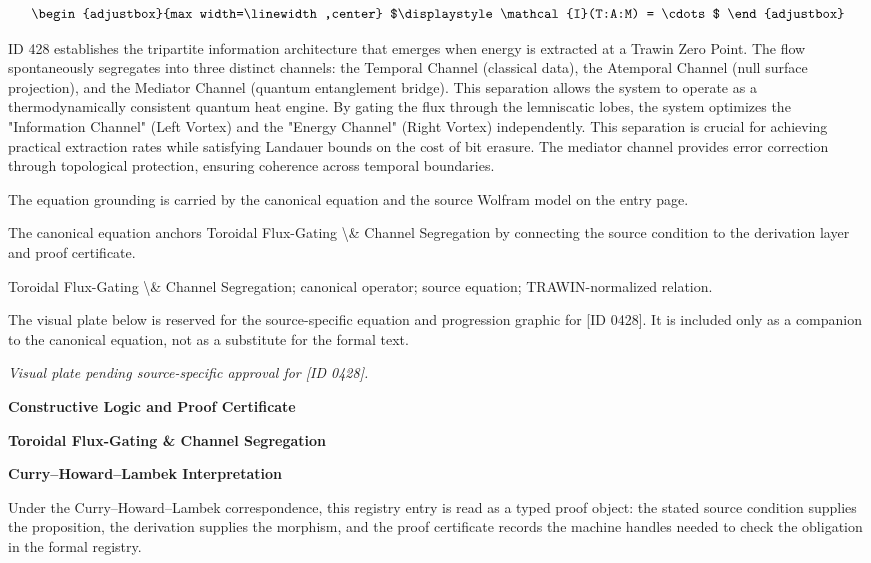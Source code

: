 \[
\begin{adjustbox}{max width=\linewidth,center}
$\displaystyle
\mathcal{I}(T:A:M) = \cdots
$
\end{adjustbox}
\]

ID 428 establishes the tripartite information architecture that emerges when energy is extracted at a Trawin Zero Point. The flow spontaneously segregates into three distinct channels: the Temporal Channel (classical data), the Atemporal Channel (null surface projection), and the Mediator Channel (quantum entanglement bridge). This separation allows the system to operate as a thermodynamically consistent quantum heat engine. By gating the flux through the lemniscatic lobes, the system optimizes the "Information Channel" (Left Vortex) and the "Energy Channel" (Right Vortex) independently. This separation is crucial for achieving practical extraction rates while satisfying Landauer bounds on the cost of bit erasure. The mediator channel provides error correction through topological protection, ensuring coherence across temporal boundaries.

The equation grounding is carried by the canonical equation and the source Wolfram model on the entry page.

The canonical equation anchors Toroidal Flux-Gating \textbackslash{}\& Channel Segregation by connecting the source condition to the derivation layer and proof certificate.

Toroidal Flux-Gating \textbackslash{}\& Channel Segregation; canonical operator; source equation; TRAWIN-normalized relation.
\endgroup

\begingroup\footnotesize\sloppy
The visual plate below is reserved for the source-specific equation and progression graphic for [ID 0428]. It is included only as a companion to the canonical equation, not as a substitute for the formal text.
\par\endgroup
\begingroup\footnotesize\itshape
Visual plate pending source-specific approval for [ID 0428].
\par\endgroup

\clearpage
\begingroup\tzpsupportsetup
\noindent\textbf{\fontsize{10.8pt}{12.8pt}\selectfont [ID 0428] Constructive Logic and Proof Certificate}\par
\noindent\textbf{\fontsize{10pt}{12pt}\selectfont Toroidal Flux-Gating \& Channel Segregation}\par
\vspace{0.45em}
\begingroup
\footnotesize
\setlength{\parskip}{0.22em}
\setlength{\parindent}{0pt}
\noindent\textbf{Curry--Howard--Lambek Interpretation}\par
Under the Curry--Howard--Lambek correspondence, this registry entry is read as a typed proof
object: the stated source condition supplies the proposition, the derivation supplies the
morphism, and the proof certificate records the machine handles needed to check the obligation
in the formal registry.


